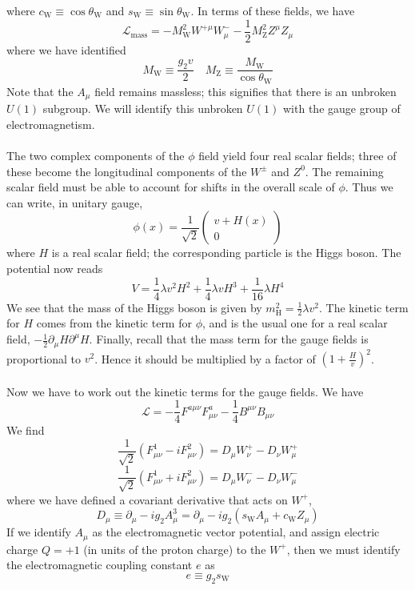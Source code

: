 where $c_{\mathrm{W}} \equiv \cos \theta_{\mathrm{W}}$ and $s_{\mathrm{W}} \equiv \sin \theta_{\mathrm{W}}$. 
In terms of these fields, we have
\[\mathcal{L}_{\mathrm{mass}} = -M_{\mathrm{W}}^2 W^{+\mu} W^{-}_{\mu} - \frac{1}{2}M_{\mathrm{Z}}^2 Z^{\mu}Z_{\mu}\]
where we have identified
\[M_{\mathrm{W}} \equiv \frac{g_2v}{2} \quad M_{\mathrm{Z}} \equiv \frac{M_{\mathrm{W}}}{\cos\theta_{\mathrm{W}}}\]
Note that the $A_{\mu}$ field remains massless; this signifies that there is an unbroken $U(1)$ subgroup. We will identify this unbroken $U(1)$ with the gauge
group of electromagnetism.
\\ \\
The two complex components of the $\phi$ field yield four real scalar fields; three of these become the longitudinal components of the $W^{\pm}$ and $Z^0$. The remaining scalar field must be able to account for shifts in the overall scale of $\phi$. Thus we can write, in unitary gauge,
\[\phi(x) = \frac{1}{\sqrt{2}} \begin{pmatrix}
v + H(x) \\ 0
\end{pmatrix}\]
where $H$ is a real scalar field; the corresponding particle is the Higgs boson. The potential now reads
\[V = \frac{1}{4}\lambda v^2H^2 + \frac{1}{4}\lambda v H^3 + \frac{1}{16}\lambda H^4\]
We see that the mass of the Higgs boson is given by $m_{\mathrm{H}}^2 = \frac{1}{2}\lambda v^2$. The kinetic term for $H$ comes from the kinetic term for $\phi$, and is the usual one for a real scalar field, $-\frac{1}{2}\partial_{\mu}H \partial^{\mu}H$. Finally, recall that the mass term for the gauge fields is proportional to $v^2$. Hence it should be multiplied by a factor of $(1 + \frac{H}{v})^2$.
\\ \\
Now we have to work out the kinetic terms for the gauge fields. We have
\[\mathcal{L} = -\frac{1}{4}F^{a\mu\nu}F^a_{\mu\nu} - \frac{1}{4}B^{\mu\nu}B_{\mu\nu}\]
We find
\[\frac{1}{\sqrt{2}} (F^1_{\mu\nu} - iF^2_{\mu\nu}) = D_{\mu} W^+_{\nu} - D_{\nu}W^+_{\mu}\]
\[\frac{1}{\sqrt{2}} (F^1_{\mu\nu} + iF^2_{\mu\nu}) = D_{\mu} W^-_{\nu} - D_{\nu}W^-_{\mu}\]
where we have defined a covariant derivative that acts on
$W^+$,
\[D_{\mu} \equiv \partial_{\mu} - ig_2A^3_{\mu} = \partial_{\mu} - ig_2(s_{\mathrm{W}}A_{\mu} + c_{\mathrm{W}} Z_{\mu})\]
If we identify $A_{\mu}$ as the electromagnetic vector potential, and assign electric charge $Q = +1$ (in units of the proton charge) to the $W^+$, then we must identify the electromagnetic coupling constant $e$ as
\[e \equiv g_2 s_{\mathrm{W}}\]
